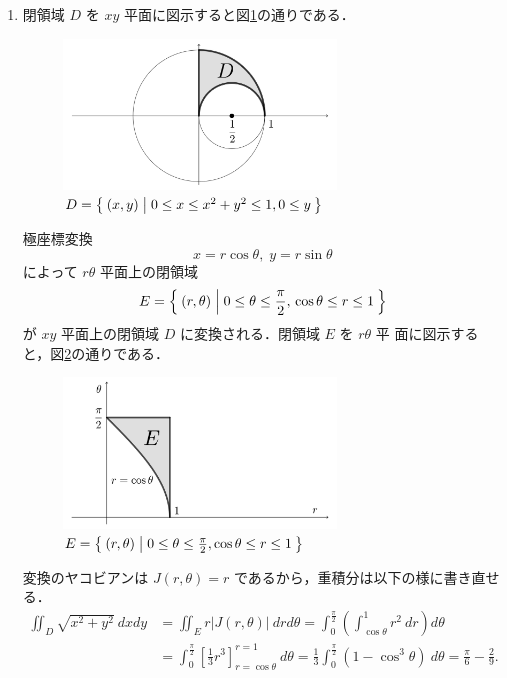 \documentclass[11pt, uplatex, dvipdfmx]{jsarticle}
\begin{document}
\begin{enumerate}[(1)]
   \item 閉領域 $D$ を $xy$ 平面に図示すると図\ref{fig:no12}の通りである．
     \begin{figure}[h]
       \centering
       \includegraphics[height=4cm]{./pictures/no12.pdf}
       \caption{$D=\Set{ (x,y) | 0 \leq x \leq x^2+y^2 \leq 1, 0 \leq y }$}\label{fig:no12}       
     \end{figure}

     極座標変換
     \[
       x=r\cos\theta, \; y=r\sin\theta
     \]
     によって $r\theta$ 平面上の閉領域
     \[
       E=\Set{ (r, \theta)  |  0 \leq \theta \leq \frac{\pi}{2}, \, \cos\theta \leq r \leq 1}
     \]
     が $xy$ 平面上の閉領域 $D$ に変換される．閉領域 $E$ を $r\theta$ 平
     面に図示すると，図\ref{fig:no12p}の通りである．
     \begin{figure}[h]
       \centering
       \includegraphics[height=4cm]{./pictures/no12p.pdf}
       \caption{$E=\Set{(r,\theta)  | 0 \leq \theta \leq \frac{\pi}{2}, \cos \theta \leq r \leq 1 }$}\label{fig:no12p}       
     \end{figure}

     変換のヤコビアンは $J(r,\theta)=r$ であるから，重積分は以下の様に書き直せる．
     \begin{align*}
       \iint_D \sqrt{x^2+y^2} \ dx dy 
       &= \iint_E r |J(r,\theta)|\ dr d\theta 
         = \int_{0}^{\frac{\pi}{2}} \left( \int_{\cos\theta}^{1} r^2 \ dr \right) d\theta\\
       &  = \int_{0}^{\frac{\pi}{2}} \left[\frac{1}{3}r^3\right]_{r=\cos\theta}^{r=1} \ d\theta
        =\frac{1}{3} \int_{0}^{\frac{\pi}{2}} \left(1-\cos^3 \theta \right) \ d\theta
       = \frac{\pi}{6}-\frac{2}{9}.
     \end{align*}


\end{enumerate}
\end{document}
